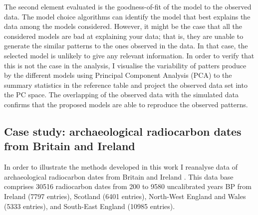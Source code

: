 \documentclass[a4paper]{article}
\begin{document}
The second element evaluated is the goodness-of-fit of the model to the observed data. The model choice algorithms can identify the model that best explains the data among the models considered. However, it might be the case that all the considered models are bad at explaining your data; that is, they are unable to generate the similar patterns to the ones observed in the data. In that case, the selected model is unlikely to give any relevant information. In order to verify that this is not the case in the analysis, I visualise the variability of patters produce by the different models using Principal Component Analysis (PCA) to the summary statistics in the reference table and project the observed data set into the PC space. The overlapping of the observed data with the simulated data confirms that the proposed models are able to reproduce the observed patterns.
\\

\subsection*{Case study: archaeological radiocarbon dates from Britain and Ireland}

In order to illustrate the methods developed in this work I reanalyse data of archaeological radiocarbon dates from Britain and Ireland \parencite{Bevan2017b}. This data base comprises 30516 radiocarbon dates from 200 to 9580 uncalibrated years BP from Ireland (7797 entries), Scotland (6401 entries), North-West England and Wales (5333 entries), and South-East England (10985 entries).
\\

\end{document}

